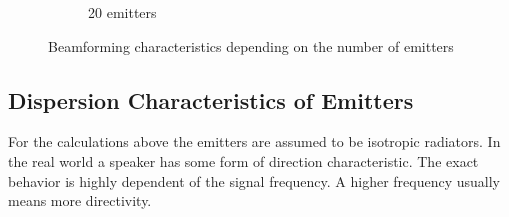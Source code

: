 \begin{figure}[ht]
\begin{subfigure}[b]{0.32\textwidth}
    \caption{20 emitters}
    \label{fig:theory:beam:num_20}
  \end{subfigure}
  \caption{Beamforming characteristics depending on the number of emitters}
  \label{fig:theory:beam:num}
\end{figure}
%
\subsection{Dispersion Characteristics of Emitters}
For the calculations above the emitters are assumed to be isotropic radiators. In the real world a speaker has some form of direction characteristic. The exact behavior is highly dependent of the signal frequency. A higher frequency usually means more directivity.\p
%
%
%
